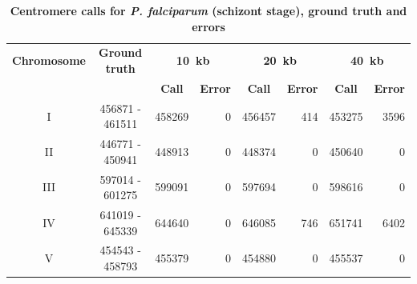 \begin{table}[ht!]
\caption{\textbf{Centromere calls for \textit{P. falciparum} (schizont stage),
ground truth and errors}}
\vspace{10pt}
\begin{center}
\begin{tabular}{c | c  r  r  r  r r r}
\textbf{Chromosome}  & \textbf{Ground truth} & \multicolumn{2}{c}{\textbf{10~kb}} & \multicolumn{2}{c}{\textbf{20~kb}} & \multicolumn{2}{c}{\textbf{40~kb}} \\
  &   &  \multicolumn{1}{c}{\textbf{Call}} &  \multicolumn{1}{c}{\textbf{Error}} &  \multicolumn{1}{c}{\textbf{Call}} &  \multicolumn{1}{c}{\textbf{Error}} &  \multicolumn{1}{c}{\textbf{Call}} &  \multicolumn{1}{c}{\textbf{Error}} \\
\hline
I & \num[group-separator={\,}]{456871} - \num[group-separator={\,}]{461511} & \num[group-separator={\,}]{458269} & \small{\num[group-separator={\,}]{0}}  & \num[group-separator={\,}]{456457} & \small{\num[group-separator={\,}]{414}}  & \num[group-separator={\,}]{453275} & \small{\num[group-separator={\,}]{3596}}  \\
II & \num[group-separator={\,}]{446771} - \num[group-separator={\,}]{450941} & \num[group-separator={\,}]{448913} & \small{\num[group-separator={\,}]{0}}  & \num[group-separator={\,}]{448374} & \small{\num[group-separator={\,}]{0}}  & \num[group-separator={\,}]{450640} & \small{\num[group-separator={\,}]{0}}  \\
III & \num[group-separator={\,}]{597014} - \num[group-separator={\,}]{601275} & \num[group-separator={\,}]{599091} & \small{\num[group-separator={\,}]{0}}  & \num[group-separator={\,}]{597694} & \small{\num[group-separator={\,}]{0}}  & \num[group-separator={\,}]{598616} & \small{\num[group-separator={\,}]{0}}  \\
IV & \num[group-separator={\,}]{641019} - \num[group-separator={\,}]{645339} & \num[group-separator={\,}]{644640} & \small{\num[group-separator={\,}]{0}}  & \num[group-separator={\,}]{646085} & \small{\num[group-separator={\,}]{746}}  & \num[group-separator={\,}]{651741} & \small{\num[group-separator={\,}]{6402}}  \\
V & \num[group-separator={\,}]{454543} - \num[group-separator={\,}]{458793} & \num[group-separator={\,}]{455379} & \small{\num[group-separator={\,}]{0}}  & \num[group-separator={\,}]{454880} & \small{\num[group-separator={\,}]{0}}  & \num[group-separator={\,}]{455537} & \small{\num[group-separator={\,}]{0}}  \\

\end{tabular}
\end{center}
\end{table}
